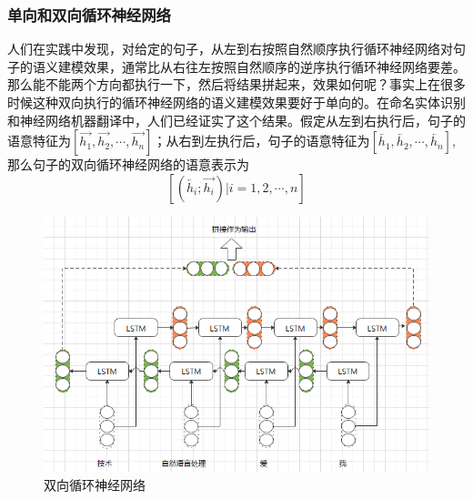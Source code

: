 \documentclass[twoside,a4paper,12pt]{book}%
\begin{document}
\subsubsection{单向和双向循环神经网络}
人们在实践中发现，对给定的句子，从左到右按照自然顺序执行循环神经网络对句子的语义建模效果，通常比从右往左按照自然顺序的逆序执行循环神经网络要差。那么能不能两个方向都执行一下，然后将结果拼起来，效果如何呢？事实上在很多时候这种双向执行的循环神经网络的语义建模效果要好于单向的。在命名实体识别和神经网络机器翻译中，人们已经证实了这个结果。假定从左到右执行后，句子的语意特征为$[\overrightarrow{h_1},\overrightarrow{h_2},\cdots,\overrightarrow{h_n}]$；从右到左执行后，句子的语意特征为$[\overleftarrow{h_1},\overleftarrow{h_2},\cdots,\overleftarrow{h_n}]$,那么句子的双向循环神经网络的语意表示为
$$[(\overleftarrow{h_i};\overrightarrow{h_i})|i=1,2,\cdots,n]$$
\begin{figure}[htbp]
\begin{center}
\includegraphics[width=5.5in]{figures/bilstm1.png}
\caption{双向循环神经网络}
\label{fig:bilstm1}
\end{center}
\end{figure}
\end{document}
